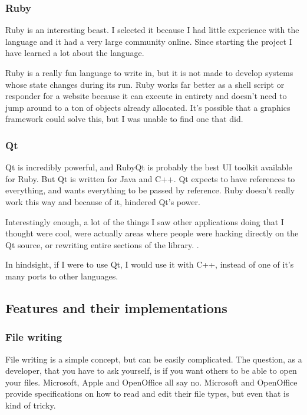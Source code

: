 \documentclass[10pt]{article}
\begin{document}
\subsubsection{Ruby}

Ruby is an interesting beast. I selected it because I had little experience with the language and it had a very large community online. Since starting the project I have learned a lot about the language.

Ruby is a really fun language to write in, but it is not made to develop systems whose state changes during its run. Ruby works far better as a shell script or responder for a website because it can execute in entirety and doesn't need to jump around to a ton of objects already allocated. It's possible that a graphics framework could solve this, but I was unable to find one that did.

\subsubsection{Qt}

Qt is incredibly powerful, and RubyQt \cite{rubyqt} is probably the best UI toolkit available for Ruby. But Qt is written for Java and C++. Qt expects to have references to everything, and wants everything to be passed by reference. Ruby doesn't really work this way and because of it, hindered Qt's power.

Interestingly enough, a lot of the things I saw other applications doing that I thought were cool, were actually areas where people were hacking directly on the Qt source, or rewriting entire sections of the library. \cite{kwrite}.

In hindsight, if I were to use Qt, I would use it with C++, instead of one of it's many ports to other languages.

\subsection{Features and their implementations}

\subsubsection{File writing}

File writing is a simple concept, but can be easily complicated. The question, as a developer, that you have to ask yourself, is if you want others to be able to open your files. Microsoft, Apple and OpenOffice all say no. Microsoft and OpenOffice provide specifications on how to read and edit their file types, but even that is kind of tricky.
\end{document}
